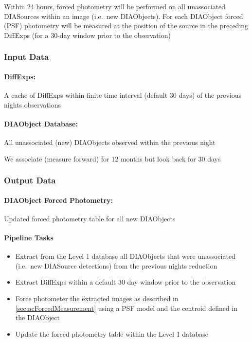 Within 24 hours, forced photometry will be performed on all unassociated DIASources within an image (i.e.\ new DIAObjects). For each DIAObject forced (PSF) photometry will be measured at the position of the source in the preceding DiffExps (for a 30-day window prior to the observation)

\subsubsection{Input Data}

\paragraph*{DiffExps:} A cache of DiffExps within finite time interval (default 30 days)  of the previous nights observations

\paragraph*{DIAObject Database:} All unassociated (new) DIAObjects observed within the previous night

\begin{note} We associate (measure forward) for 12 months but look back for 30 days\end{note}

\subsubsection{Output Data}

\paragraph*{DIAObject Forced Photometry:} Updated forced photometry table for all new DIAObjects


\paragraph{Pipeline Tasks}
\begin{itemize}
\item Extract from the Level 1 database all DIAObjects that were unassociated (i.e.\ new DIASource detections) from the previous nights reduction
\item Extract DiffExps within a  default 30 day window prior to the observation
\item Force photometer the extracted images as described in \ref{sec:acForcedMeasurement} using a PSF model and the centroid defined in the DIAObject
\item Update the forced photometry table within the Level 1 database
\end{itemize}
\clearpage



